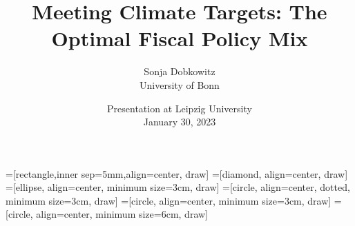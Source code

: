 \documentclass[11pt,aspectratio=169]{beamer}
\author[Sonja Dobkowitz]{\small Sonja Dobkowitz\\ \footnotesize{University of Bonn%
}\\ }
\title{Meeting Climate Targets: The Optimal Fiscal Policy Mix}
\date{\small{Presentation at Leipzig University\\ January 30, 2023 }}
\begin{document}
=[rectangle,inner sep=5mm,align=center, draw]
=[diamond, align=center, draw]
=[ellipse, align=center,  minimum size=3cm, draw]
=[circle, align=center, dotted, minimum size=3cm, draw]
=[circle, align=center, minimum size=3cm, draw]
=[circle, align=center, minimum size=6cm, draw]

{
	\begin{frame}
		\titlepage
	\end{frame}
}



\end{document}
